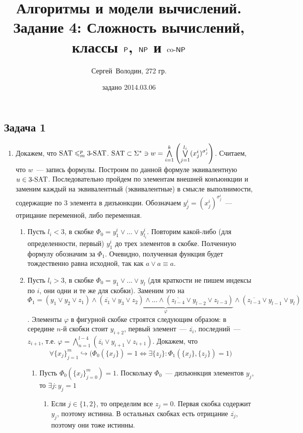 \documentclass[a4paper]{article}
\date{задано 2014.03.06}
\author{Сергей~Володин, 272 гр.}
\title{Алгоритмы и модели вычислений.\\Задание 4: Сложность вычислений, классы ${\mathsf{P}}$, ${\mathsf{NP}}$ и ${\rm co}\text{-}{\mathsf{NP}}$}
\def\SAT{{\rm{SAT}}}
\def\3SAT{{\rm{3\text{-}SAT}}}
\begin{document}
\maketitle
\subsection*{Задача 1}
\begin{enumerate}
\item \label{sat3sat} Докажем, что $\SAT\leqslant_m^p \3SAT$. $\SAT\subset\Sigma^*\ni w=\bigwedge\limits_{i=1}^k\left(\bigvee\limits_{j=1}^{l_i}(x^i_j)^{\sigma^i_j}\right)$. Считаем, что $w$~--- запись формулы. Построим по данной формуле эквивалентную $u\in \3SAT$. Последовательно пройдем по элементам внешней конъюнкции и заменим каждый на эквивалентный (эквивалентные) в смысле выполнимости, содержащие по 3 элемента в дизъюнкции. Обозначаем $y^i_j=(x^i_j)^{\sigma^i_j}$~--- отрицание переменной, либо переменная.\begin{enumerate}
\item Пусть $l_i<3$, в скобке $\Phi_0=y^i_1\vee...\vee y^i_{l_i}$. Повторим какой-либо (для определенности, первый) $y^i_1$ до трех элементов в скобке. Полченную формулу обозначим за $\Phi_1$. Очевидно, полученная функция будет тождественно равна исходной, так как $a\vee a\equiv a$.
\item Пусть $l_i>3$, в скобке $\Phi_0=y_1\vee...\vee y_l$ (для краткости не пишем индексы по $i$, они одни и те же для скобки). Заменим это на $\Phi_1=(y_1\vee y_2\vee z_1)\wedge\underbrace{(\overline{z_1}\vee y_3\vee z_2)\wedge...\wedge(\overline{z_{l-4}}\vee y_{l-2}\vee z_{l-3})}_{\varphi}\wedge (\overline{z_{l-3}}\vee y_{l-1}\vee y_l)$. Элементы $\varphi$ в фигурной скобке строятся следующим образом: в середине $n$-й скобки стоит $y_{i+2}$, первый элемент~--- $\overline{z_{i}}$, последний~--- $z_{i+1}$, т.е. $\varphi=\bigwedge\limits_{n=1}^{l-4}(\overline{z_i}\vee y_{i+1}\vee z_{i+1})$. Докажем, что $$\forall\{x_j\}_{j=1}^m\hookrightarrow\big(\Phi_0(\{x_j\})=1\Leftrightarrow \exists \{z_j\}\colon \Phi_1(\{x_j\},\{z_j\})=1\big)$$\begin{enumerate}
\item Пусть $\Phi_0(\{x_j\}_{j=0}^m)=1$. Поскольку $\Phi_0$~--- дизъюнкция элементов $y_j$, то $\exists j\colon y_j=1$\begin{enumerate}
\item Если $j\in\{1,2\}$, то определим все $z_j=0$. Первая скобка содержит $y_j$, поэтому истинна. В остальных скобках есть отрицание $\overline{z_j}$, поэтому они тоже истинны.

\end{enumerate}
\end{enumerate}
\end{enumerate}
\end{enumerate}
\end{document}
